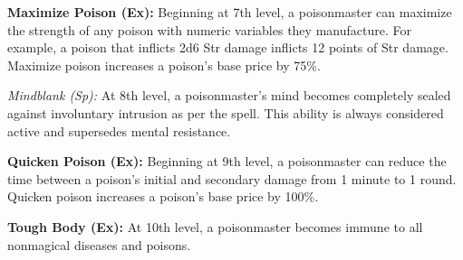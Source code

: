 {\textbf{Maximize Poison (Ex):} Beginning at 7th level, a poisonmaster can maximize the strength of any poison with numeric variables they manufacture. For example, a poison that inflicts 2d6 Str damage inflicts 12 points of Str damage. Maximize poison increases a poison's base price by 75\%.

\textit{Mindblank (Sp):} At 8th level, a poisonmaster's mind becomes completely sealed against involuntary intrusion as per the  spell. This ability is always considered active and supersedes mental resistance.

\textbf{Quicken Poison (Ex):} Beginning at 9th level, a poisonmaster can reduce the time between a poison's initial and secondary damage from 1 minute to 1 round. Quicken poison increases a poison's base price by 100\%.

\textbf{Tough Body (Ex):} At 10th level, a poisonmaster becomes immune to all nonmagical diseases and poisons.
}